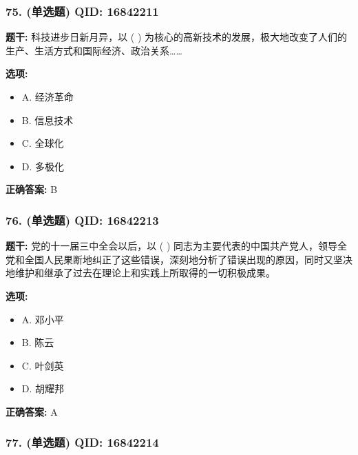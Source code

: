 \documentclass[12pt,UTF8]{ctexart}
\begin{document}
\subsubsection*{75. (单选题) \small QID: 16842211}

\textbf{题干:}
科技进步日新月异，以 ( ) 为核心的高新技术的发展，极大地改变了人们的生产、生活方式和国际经济、政治关系……

\textbf{选项:}
\begin{itemize}[leftmargin=*]

  \item A. 经济革命

  \item B. 信息技术

  \item C. 全球化

  \item D. 多极化

\end{itemize}

\textbf{正确答案:}
B

\vspace{0.3em}\hrulefill\vspace{0.7em}

\subsubsection*{76. (单选题) \small QID: 16842213}

\textbf{题干:}
党的十一届三中全会以后，以 ( ) 同志为主要代表的中国共产党人，领导全党和全国人民果断地纠正了这些错误，深刻地分析了错误出现的原因，同时又坚决地维护和继承了过去在理论上和实践上所取得的一切积极成果。

\textbf{选项:}
\begin{itemize}[leftmargin=*]

  \item A. 邓小平

  \item B. 陈云

  \item C. 叶剑英

  \item D. 胡耀邦

\end{itemize}

\textbf{正确答案:}
A

\vspace{0.3em}\hrulefill\vspace{0.7em}

\subsubsection*{77. (单选题) \small QID: 16842214}
\end{document}
